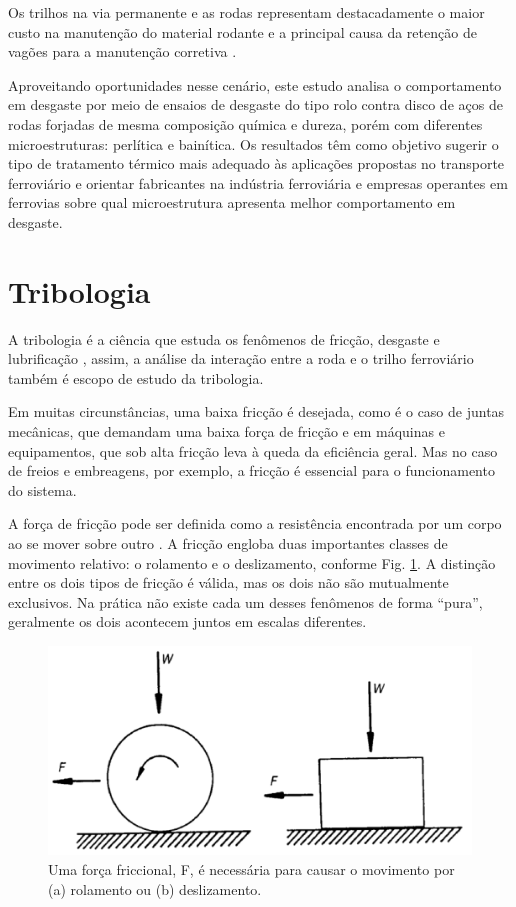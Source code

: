 \documentclass[
12pt,
openany, %
oneside, %
a4paper,			
english,			
brazil			        %
]{abntbibufjf}
\begin{document}
	Os trilhos na via permanente e as rodas representam destacadamente o maior custo na manutenção do material rodante e a principal causa da retenção de vagões para a manutenção corretiva \cite{alves1997carga}.
	
	Aproveitando oportunidades nesse cenário, este estudo analisa o comportamento em desgaste por meio de ensaios de desgaste do tipo rolo contra disco de aços de rodas forjadas de mesma composição química e dureza, porém com diferentes microestruturas: perlítica e bainítica. Os resultados têm como objetivo sugerir o tipo de tratamento térmico mais adequado às aplicações propostas no transporte ferroviário e orientar fabricantes na indústria ferroviária e empresas operantes em ferrovias sobre qual microestrutura apresenta melhor comportamento em desgaste. 

	\section{Tribologia}
	
	A tribologia é a ciência que estuda os fenômenos de fricção, desgaste e lubrificação \cite{hutchings1992tribology}, assim, a análise da interação entre a roda e o trilho ferroviário também é escopo de estudo da tribologia.
	
	Em muitas circunstâncias, uma baixa fricção é desejada, como é o caso de juntas mecânicas, que demandam uma baixa força de fricção e em máquinas e equipamentos, que sob alta fricção leva à queda da eficiência geral. Mas no caso de freios e embreagens, por exemplo, a fricção é essencial para o funcionamento do sistema.
	
	A força de fricção pode ser definida como a resistência encontrada por um corpo ao se mover sobre outro \cite{hutchings1992tribology}. A fricção engloba duas importantes classes de movimento relativo: o rolamento e o deslizamento, conforme Fig. \ref{fig:rolamento_deslizamento}. A distinção entre os dois tipos de fricção é válida, mas os dois não são mutualmente exclusivos. Na prática não existe cada um desses fenômenos de forma ``pura'', geralmente os dois acontecem juntos em escalas diferentes.
	
	\begin{figure}[H]
		\centering
		\includegraphics[width=1\textwidth]{rolamento_deslizamento}
		\caption{Uma força friccional, F, é necessária para causar o movimento por (a) rolamento ou (b) deslizamento. \cite{hutchings1992tribology}}
		\label{fig:rolamento_deslizamento}
	\end{figure}
\end{document}
